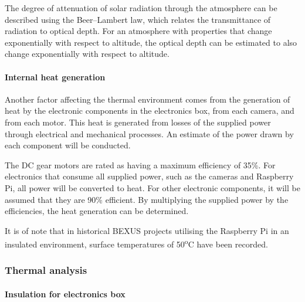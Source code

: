 The degree of attenuation of solar radiation through the atmosphere can be described using the Beer–Lambert law, which relates the transmittance of radiation to optical depth. For an atmosphere with properties that change exponentially with respect to altitude, the optical depth can be estimated to also change exponentially with respect to altitude. \\

\paragraph{Internal heat generation}
Another factor affecting the thermal environment comes from the generation of heat by the electronic components in the electronics box, from each camera, and from each motor. This heat is generated from losses of the supplied power through electrical and mechanical processes. An estimate of the power drawn by each component will be conducted.



The DC gear motors are rated as having a maximum efficiency of 35\%. 
For electronics that consume all supplied power, such as the cameras and Raspberry Pi, all power will be converted to heat.
For other electronic components, it will be assumed that they are 90\% efficient. By multiplying the supplied power by the efficiencies, the heat generation can be determined.



It is of note that in historical BEXUS projects utilising the Raspberry Pi in an insulated environment, surface temperatures of 50\textsuperscript{o}C have been recorded. 





















\subsubsection{Thermal analysis}

\paragraph{Insulation for electronics box}

